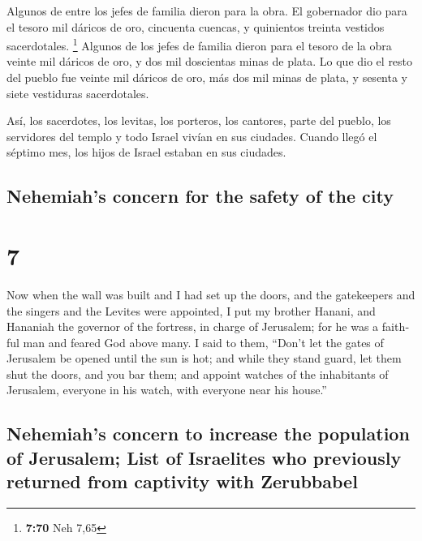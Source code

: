 \begin{paracol}{2}
 Algunos de entre los jefes de familia dieron para la
obra. El gobernador dio para el tesoro mil dáricos de oro, cincuenta
cuencas, y quinientos treinta vestidos sacerdotales. \footnote{\textbf{7:70}
  Neh 7,65}  Algunos de los jefes de familia dieron para
el tesoro de la obra veinte mil dáricos de oro, y dos mil doscientas
minas de plata.  Lo que dio el resto del pueblo fue
veinte mil dáricos de oro, más dos mil minas de plata, y sesenta y siete
vestiduras sacerdotales.

 Así, los sacerdotes, los levitas, los porteros, los
cantores, parte del pueblo, los servidores del templo y todo Israel
vivían en sus ciudades. Cuando llegó el séptimo mes, los hijos de Israel
estaban en sus ciudades.

\switchcolumn
\begin{otherlanguage}{english}

\hypertarget{nehemiahs-concern-for-the-safety-of-the-city}{%
\subsection{Nehemiah's concern for the safety of the
city}\label{nehemiahs-concern-for-the-safety-of-the-city}}

\hypertarget{section-13}{%
\section{7}\label{section-13}}

 Now when the wall was built and I had set up the doors,
and the gatekeepers and the singers and the Levites were appointed,
 I put my brother Hanani, and Hananiah the governor of the
fortress, in charge of Jerusalem; for he was a faithful man and feared
God above many.  I said to them, ``Don't let the gates of
Jerusalem be opened until the sun is hot; and while they stand guard,
let them shut the doors, and you bar them; and appoint watches of the
inhabitants of Jerusalem, everyone in his watch, with everyone near his
house.''

\hypertarget{nehemiahs-concern-to-increase-the-population-of-jerusalem-list-of-israelites-who-previously-returned-from-captivity-with-zerubbabel}{%
\subsection{Nehemiah's concern to increase the population of Jerusalem;
List of Israelites who previously returned from captivity with
Zerubbabel}\label{nehemiahs-concern-to-increase-the-population-of-jerusalem-list-of-israelites-who-previously-returned-from-captivity-with-zerubbabel}}


\end{otherlanguage}
\end{paracol}
